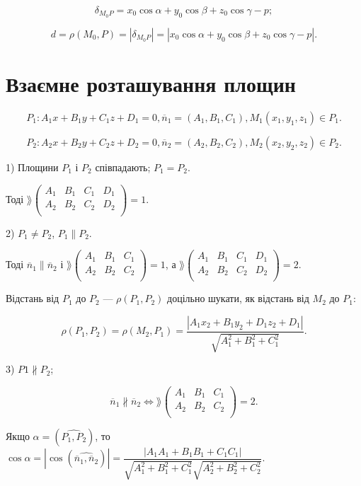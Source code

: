 $$\delta_{M_0P} = x_0 \cos \alpha + y_0 \cos \beta + z_0 \cos \gamma - p;$$

$$d = \rho(M_0,P) = |\delta_{M_0P}| = |x_0 \cos \alpha + y_0 \cos \beta + z_0 \cos \gamma - p|.$$



\section{Взаємне розташування площин}

$$P_1: A_1 x + B_1 y + C_1 z + D_1 = 0, \overline{n}_1 = (A_1,B_1,C_1), M_1(x_1,y_1,z_1)\in P_1.$$

$$P_2: A_2 x + B_2 y + C_2 z + D_2 = 0, \overline{n}_2 = (A_2,B_2,C_2), M_2(x_2,y_2,z_2)\in P_2.$$

1) Площини $P_1$ і $P_2$ співпадають; $P_1 = P_2$.

Тоді $\rang \begin{pmatrix}
	A_1 & B_1 & C_1 & D_1 \\
	A_2 & B_2 & C_2 & D_2 \\
\end{pmatrix} = 1.$

2) $P_1 \neq P_2$, $P_1 \parallel P_2$.

Тоді $\overline{n}_1 \parallel \overline{n}_2$ і $\rang \begin{pmatrix}
	A_1 & B_1 & C_1 \\
	A_2 & B_2 & C_2 \\
\end{pmatrix} = 1$, а $\rang \begin{pmatrix}
	A_1 & B_1 & C_1 & D_1 \\
	A_2 & B_2 & C_2 & D_2 \\
\end{pmatrix} = 2$.

Відстань від $P_1$ до $P_2$ --- $\rho(P_1,P_2)$ доцільно шукати, як відстань від $M_2$ до $P_1$:

$$\rho(P_1,P_2) = \rho(M_2,P_1) = \dfrac{|A_1 x_2 + B_1 y_2 + D_1 z_2 + D_1|}{\sqrt{A_1^2 + B_1^2 + C_1^2}}.$$


3) $P1 \nparallel P_2$;

$$\overline{n}_1 \nparallel \overline{n}_2 \Leftrightarrow \rang \begin{pmatrix}
	A_1 & B_1 & C_1 \\
	A_2 & B_2 & C_2 \\
\end{pmatrix} = 2.$$


Якщо $\alpha = (\widehat{P_1,P_2})$, то $\cos \alpha = |\cos(\widehat{\overline{n}_1,\overline{n}_2})|
= \dfrac{|A_1A_1 + B_1B_1 + C_1C_1|}{\sqrt{A_1^2 + B_1^2 + C_1^2}\sqrt{A_2^2 + B_2^2 + C_2^2}}$.



